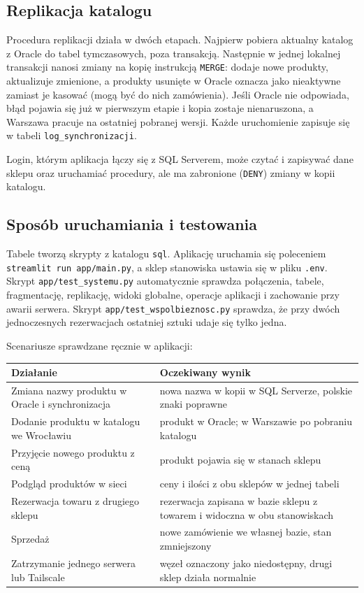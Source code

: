 \documentclass[11pt,a4paper]{article}
\begin{document}
\subsection{Replikacja katalogu}
Procedura replikacji działa w dwóch etapach. Najpierw pobiera aktualny katalog z Oracle
do tabel tymczasowych, poza transakcją. Następnie w jednej lokalnej transakcji nanosi
zmiany na kopię instrukcją \texttt{MERGE}: dodaje nowe produkty, aktualizuje zmienione,
a produkty usunięte w Oracle oznacza jako nieaktywne zamiast je kasować (mogą być do nich
zamówienia). Jeśli Oracle nie odpowiada, błąd pojawia się już w pierwszym etapie i kopia
zostaje nienaruszona, a Warszawa pracuje na ostatniej pobranej wersji. Każde uruchomienie
zapisuje się w tabeli \texttt{log\_synchronizacji}.

Login, którym aplikacja łączy się z SQL Serverem, może czytać i zapisywać dane sklepu
oraz uruchamiać procedury, ale ma zabronione (\texttt{DENY}) zmiany w kopii katalogu.

\subsection{Sposób uruchamiania i testowania}
Tabele tworzą skrypty z katalogu \texttt{sql}. Aplikację uruchamia się poleceniem
\texttt{streamlit run app/main.py}, a sklep stanowiska ustawia się w pliku \texttt{.env}.
Skrypt \texttt{app/test\_systemu.py} automatycznie sprawdza połączenia, tabele,
fragmentację, replikację, widoki globalne, operacje aplikacji i zachowanie przy
awarii serwera. Skrypt \texttt{app/test\_wspolbieznosc.py} sprawdza, że przy dwóch
jednoczesnych rezerwacjach ostatniej sztuki udaje się tylko jedna.

Scenariusze sprawdzane ręcznie w aplikacji:

{\small
\begin{tabularx}{\textwidth}{@{}>{\raggedright\arraybackslash}p{}X@{}}
\toprule
\textbf{Działanie} & \textbf{Oczekiwany wynik} \\
\midrule
Zmiana nazwy produktu w Oracle i synchronizacja & nowa nazwa w kopii w SQL Serverze, polskie znaki poprawne \\
Dodanie produktu w katalogu we Wrocławiu & produkt w Oracle; w Warszawie po pobraniu katalogu \\
Przyjęcie nowego produktu z ceną & produkt pojawia się w stanach sklepu \\
Podgląd produktów w sieci & ceny i ilości z obu sklepów w jednej tabeli \\
Rezerwacja towaru z drugiego sklepu & rezerwacja zapisana w bazie sklepu z towarem i widoczna w obu stanowiskach \\
Sprzedaż & nowe zamówienie we własnej bazie, stan zmniejszony \\
Zatrzymanie jednego serwera lub Tailscale & węzeł oznaczony jako niedostępny, drugi sklep działa normalnie \\
\bottomrule
\end{tabularx}\par}
\end{document}

